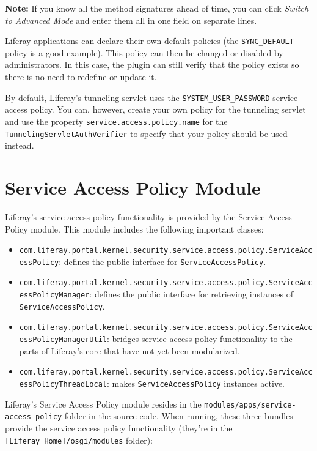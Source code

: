 \noindent\hrulefill

\textbf{Note:} If you know all the method signatures ahead of time, you
can click \emph{Switch to Advanced Mode} and enter them all in one field
on separate lines.

\noindent\hrulefill

Liferay applications can declare their own default policies (the
\texttt{SYNC\_DEFAULT} policy is a good example). This policy can then
be changed or disabled by administrators. In this case, the plugin can
still verify that the policy exists so there is no need to redefine or
update it.

By default, Liferay's tunneling servlet uses the
\texttt{SYSTEM\_USER\_PASSWORD} service access policy. You can, however,
create your own policy for the tunneling servlet and use the property
\texttt{service.access.policy.name} for the
\texttt{TunnelingServletAuthVerifier} to specify that your policy should
be used instead.

\section{Service Access Policy
Module}\label{service-access-policy-module}

Liferay's service access policy functionality is provided by the Service
Access Policy module. This module includes the following important
classes:

\begin{itemize}
\tightlist
\item
  \texttt{com.liferay.portal.kernel.security.service.access.policy.ServiceAccessPolicy}:
  defines the public interface for \texttt{ServiceAccessPolicy}.
\item
  \texttt{com.liferay.portal.kernel.security.service.access.policy.ServiceAccessPolicyManager}:
  defines the public interface for retrieving instances of
  \texttt{ServiceAccessPolicy}.
\item
  \texttt{com.liferay.portal.kernel.security.service.access.policy.ServiceAccessPolicyManagerUtil}:
  bridges service access policy functionality to the parts of Liferay's
  core that have not yet been modularized.
\item
  \texttt{com.liferay.portal.kernel.security.service.access.policy.ServiceAccessPolicyThreadLocal}:
  makes \texttt{ServiceAccessPolicy} instances active.
\end{itemize}

Liferay's Service Access Policy module resides in the
\texttt{modules/apps/service-access-policy} folder in the source code.
When running, these three bundles provide the service access policy
functionality (they're in the \texttt{{[}Liferay\ Home{]}/osgi/modules}
folder):

